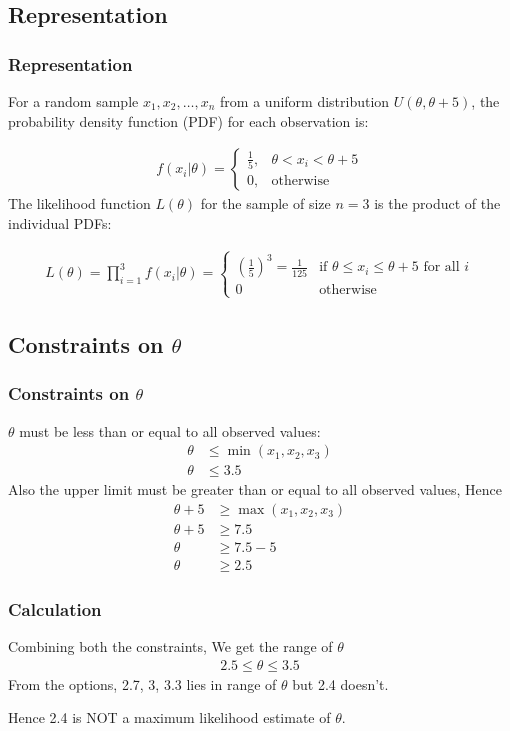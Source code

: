 \documentclass{beamer}
\theoremstyle{remark}
\numberwithin{equation}{section}
\begin{document}
\subsection{Representation}
\setcounter{section}{1}
\begin{frame}
\frametitle{Representation}
 For a random sample $x_1, x_2, \dots, x_n$ from a uniform distribution $U(\theta, \theta+5)$, the probability density function (PDF) for each observation is:

\begin{align}
f(x_i | \theta) = 
\begin{cases} 
\frac{1}{5}, & \theta < x_i < \theta + 5 \\
0, & \text{otherwise}
\end{cases}
\end{align}
The likelihood function $L(\theta)$ for the sample of size $n=3$ is the product of the individual PDFs:

\begin{align}
L(\theta) = \prod_{i=1}^{3} f(x_i | \theta) = 
\begin{cases} 
\left(\frac{1}{5}\right)^3 = \frac{1}{125} & \text{if } \theta \leq x_i \leq \theta + 5 \text{ for all } i \\ 
0 & \text{otherwise} 
\end{cases}
\end{align}

\end{frame}
\subsection{Constraints on $\theta$}
\begin{frame}
\frametitle{Constraints on $\theta$}
$\theta$ must be less than or equal to all observed values:
\begin{align}
\theta &\le \min(x_1, x_2, x_3) \\
\theta &\le 3.5 
\end{align}
Also the upper limit must be greater than or equal to all observed values, Hence
\begin{align}
\theta + 5 &\geq \max(x_1, x_2, x_3) \\
\theta + 5 &\geq 7.5 \\
\theta &\geq 7.5 - 5 \\
\theta &\geq 2.5 
\end{align}

\end{frame}

\begin{frame}
\frametitle{Calculation}
 Combining both the constraints, We get the range of $\theta$
 \begin{align}
     2.5 \leq \theta \leq 3.5
 \end{align}
 From the options,
 2.7, 3, 3.3 lies in range of $\theta$ but 2.4 doesn't.
 
 Hence 2.4 is NOT a maximum likelihood estimate of $\theta$.
 \end{frame}
\end{document}
